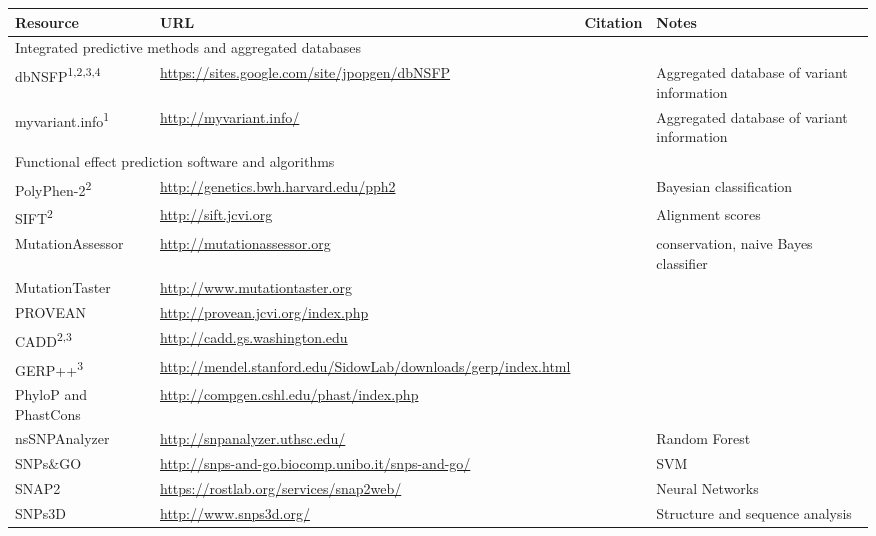 \documentclass{article}
\begin{document}
\begin{table}[p]
  \footnotesize
\centering
\begin{tabularx}{1\textwidth}{p{2.5cm}Xp{3.5cm}p{3.5cm}}
  \toprule
Resource & URL & Citation & Notes \\
  \midrule
  \multicolumn{4}{l}{Integrated predictive methods and aggregated databases}    \\
  \midrule
  dbNSFP\textsuperscript{1,2,3,4} & \url{https://sites.google.com/site/jpopgen/dbNSFP} &
  \parencite{Liu2016-iv} & Aggregated database of variant information
  \\
  myvariant.info\textsuperscript{1} & \url{http://myvariant.info/} &
  \parencite{Xin2016-yc} & Aggregated database of variant information \\
  \midrule
  \multicolumn{4}{l}{Functional effect prediction software and algorithms}    \\
  \midrule
  PolyPhen-2\textsuperscript{2} & \url{http://genetics.bwh.harvard.edu/pph2} & \parencite{Adzhubei2013-nj} & Bayesian classification \\
  SIFT\textsuperscript{2} & \url{http://sift.jcvi.org} & \parencite{Ng2003-vp} & Alignment scores \\
  MutationAssessor & \url{http://mutationassessor.org} & \parencite{Reva2011-en} & conservation, naive Bayes classifier \\
  MutationTaster & \url{http://www.mutationtaster.org} & \parencite{Schwarz2014-ep} &   \\
  PROVEAN & \url{http://provean.jcvi.org/index.php} & \parencite{Choi2012-tk} &   \\
  CADD\textsuperscript{2,3} & \url{http://cadd.gs.washington.edu} & \parencite{Kircher2014-im} &   \\
  GERP++\textsuperscript{3} & \url{http://mendel.stanford.edu/SidowLab/downloads/gerp/index.html} & \parencite{Davydov2010-ui} &   \\
  PhyloP and PhastCons & \url{http://compgen.cshl.edu/phast/index.php} & \parencite{Siepel2005-ke,Pollard2010-of} &   \\
  nsSNPAnalyzer & \url{http://snpanalyzer.uthsc.edu/} & \parencite{Bao2005-jn} & Random Forest \\
  SNPs\&GO & \url{http://snps-and-go.biocomp.unibo.it/snps-and-go/} & \parencite{Calabrese2009-mi} & SVM \\
  SNAP2 & \url{https://rostlab.org/services/snap2web/} & \parencite{Hecht2015-ti} & Neural Networks \\
  SNPs3D & \url{http://www.snps3d.org/} & \parencite{Yue2006-kj} & Structure and sequence analysis \\

\end{tabularx}
\end{table}
\end{document}
